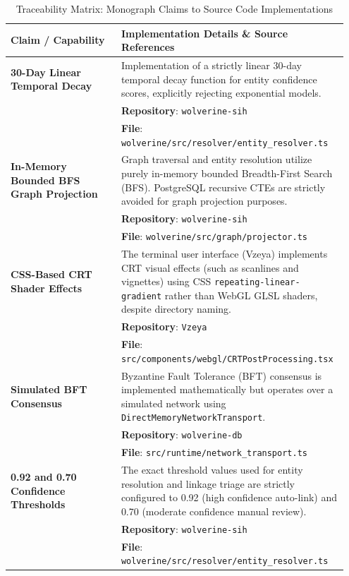 \begin{table}[h!]
\centering
\caption{Traceability Matrix: Monograph Claims to Source Code Implementations}
\label{tab:traceability-matrix}
\renewcommand{\arraystretch}{1.6}
\begin{tabular}{|p{0.32\linewidth}|p{0.63\linewidth}|}
\hline
\textbf{Claim / Capability} & \textbf{Implementation Details \& Source References} \\
\hline
\textbf{30-Day Linear Temporal Decay} & Implementation of a strictly linear 30-day temporal decay function for entity confidence scores, explicitly rejecting exponential models. \\
& \textbf{Repository}: \texttt{wolverine-sih} \\
& \textbf{File}: \texttt{wolverine/src/resolver/entity\_resolver.ts} \\
\hline
\textbf{In-Memory Bounded BFS Graph Projection} & Graph traversal and entity resolution utilize purely in-memory bounded Breadth-First Search (BFS). PostgreSQL recursive CTEs are strictly avoided for graph projection purposes. \\
& \textbf{Repository}: \texttt{wolverine-sih} \\
& \textbf{File}: \texttt{wolverine/src/graph/projector.ts} \\
\hline
\textbf{CSS-Based CRT Shader Effects} & The terminal user interface (Vzeya) implements CRT visual effects (such as scanlines and vignettes) using CSS \texttt{repeating-linear-gradient} rather than WebGL GLSL shaders, despite directory naming. \\
& \textbf{Repository}: \texttt{Vzeya} \\
& \textbf{File}: \texttt{src/components/webgl/CRTPostProcessing.tsx} \\
\hline
\textbf{Simulated BFT Consensus} & Byzantine Fault Tolerance (BFT) consensus is implemented mathematically but operates over a simulated network using \texttt{DirectMemoryNetworkTransport}. \\
& \textbf{Repository}: \texttt{wolverine-db} \\
& \textbf{File}: \texttt{src/runtime/network\_transport.ts} \\
\hline
\textbf{0.92 and 0.70 Confidence Thresholds} & The exact threshold values used for entity resolution and linkage triage are strictly configured to 0.92 (high confidence auto-link) and 0.70 (moderate confidence manual review). \\
& \textbf{Repository}: \texttt{wolverine-sih} \\
& \textbf{File}: \texttt{wolverine/src/resolver/entity\_resolver.ts} \\
\hline
\end{tabular}
\end{table}

